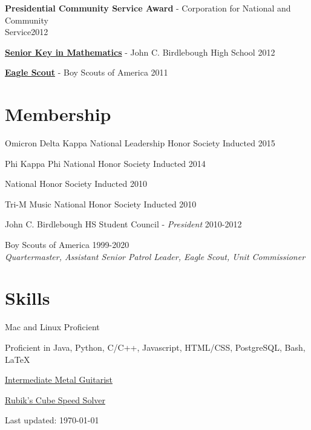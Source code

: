 \documentclass[8pt]{article}
\def\footerlink{}
\renewenvironment{itemize}{
  \begin{list}{}{
    \setlength{\leftmargin}{1.5em}
  }
}{
  \end{list}
}
\begin{document}
\begin{itemize}
\item \textbf{Presidential Community Service Award} - Corporation for National and Community \\Service\hfill 2012

\item \textbf{\href{http://www.oswegocountyweeklies.com/phoenix_register.php?details&story_id=5503&story_year=2012&story_month=6}{Senior Key in Mathematics}} - John C. Birdlebough High School \hfill 2012

\item \textbf{\href{http://www.oswegocountyweeklies.com/phoenix_register.php?details&story_id=6083&story_year=2012&story_month=8}{Eagle Scout}} - Boy Scouts of America \hfill 2011
\end{itemize}

\section*{Membership}
\begin{itemize}
\item Omicron Delta Kappa National Leadership Honor Society \hfill Inducted 2015
\item Phi Kappa Phi National Honor Society \hfill Inducted 2014
\item National Honor Society \hfill Inducted 2010
\item Tri-M Music National Honor Society \hfill Inducted 2010
\item John C. Birdlebough HS Student Council - \emph{President} \hfill 2010-2012
\item Boy Scouts of America \hfill 1999-2020\\
\emph{Quartermaster, Assistant Senior Patrol Leader, Eagle Scout, Unit Commissioner}
\end{itemize}

\section*{Skills}
\begin{itemize}
\item Mac and Linux Proficient
\item Proficient in Java, Python, C/C++, Javascript, HTML/CSS, PostgreSQL, Bash, {\LaTeX}
\item \href{https://youtu.be/B5kcOSP527U}{Intermediate Metal Guitarist}
\item \href{https://youtu.be/qPBg2xok04s}{Rubik's Cube Speed Solver}
\end{itemize}

\bigskip

\begin{center}
  \begin{footnotesize}
    Last updated: \today \\
    \href{\footerlink}{\texttt{\footerlink}}
  \end{footnotesize}
\end{center}
\end{document}
